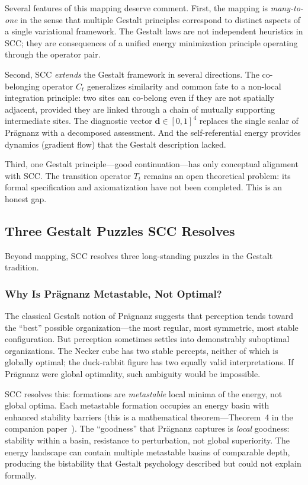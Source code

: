 \documentclass[lettersize,journal]{IEEEtran}
\begin{document}
Several features of this mapping deserve comment. First, the mapping is \emph{many-to-one} in the sense that multiple Gestalt principles correspond to distinct aspects of a single variational framework. The Gestalt laws are not independent heuristics in SCC; they are consequences of a unified energy minimization principle operating through the operator pair.

Second, SCC \emph{extends} the Gestalt framework in several directions. The co-belonging operator $C_t$ generalizes similarity and common fate to a non-local integration principle: two sites can co-belong even if they are not spatially adjacent, provided they are linked through a chain of mutually supporting intermediate sites. The diagnostic vector $\mathbf{d} \in [0,1]^4$ replaces the single scalar of Pr\"{a}gnanz with a decomposed assessment. And the self-referential energy provides dynamics (gradient flow) that the Gestalt description lacked.

Third, one Gestalt principle---good continuation---has only conceptual alignment with SCC. The transition operator $T_t$ remains an open theoretical problem: its formal specification and axiomatization have not been completed. This is an honest gap.

\subsection{Three Gestalt Puzzles SCC Resolves}

Beyond mapping, SCC resolves three long-standing puzzles in the Gestalt tradition.

\subsubsection{Why Is Pr\"{a}gnanz Metastable, Not Optimal?}

The classical Gestalt notion of Pr\"{a}gnanz suggests that perception tends toward the ``best'' possible organization---the most regular, most symmetric, most stable configuration. But perception sometimes settles into demonstrably suboptimal organizations. The Necker cube has two stable percepts, neither of which is globally optimal; the duck-rabbit figure has two equally valid interpretations. If Pr\"{a}gnanz were global optimality, such ambiguity would be impossible.

SCC resolves this: formations are \emph{metastable} local minima of the energy, not global optima. Each metastable formation occupies an energy basin with enhanced stability barriers (this is a mathematical theorem---Theorem~4 in the companion paper~\cite{paper1}). The ``goodness'' that Pr\"{a}gnanz captures is \emph{local} goodness: stability within a basin, resistance to perturbation, not global superiority. The energy landscape can contain multiple metastable basins of comparable depth, producing the bistability that Gestalt psychology described but could not explain formally.
\end{document}
